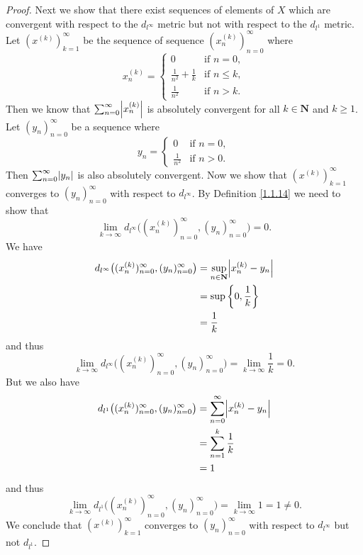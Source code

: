 \begin{proof}
    Next we show that there exist sequences of elements of \(X\) which are convergent with respect to the \(d_{l^\infty}\) metric but not with respect to the \(d_{l^1}\) metric.
    Let \((x^{(k)})_{k = 1}^\infty\) be the sequence of sequence \((x_n^{(k)})_{n = 0}^\infty\) where
    \[
        x_n^{(k)} = \begin{cases}
            0                           & \text{if } n = 0,    \\
            \frac{1}{n^2} + \frac{1}{k} & \text{if } n \leq k, \\
            \frac{1}{n^2}               & \text{if } n > k.
        \end{cases}
    \]
    Then we know that \(\sum_{n = 0}^\infty \abs*{x_n^{(k)}}\) is absolutely convergent for all \(k \in \mathbf{N}\) and \(k \geq 1\).
    Let \((y_n)_{n = 0}^\infty\) be a sequence where
    \[
        y_n = \begin{cases}
            0             & \text{if } n = 0, \\
            \frac{1}{n^2} & \text{if } n > 0.
        \end{cases}
    \]
    Then \(\sum_{n = 0}^\infty \abs*{y_n}\) is also absolutely convergent.
    Now we show that \((x^{(k)})_{k = 1}^\infty\) converges to \((y_n)_{n = 0}^\infty\) with respect to \(d_{l^\infty}\).
    By Definition \ref{1.1.14} we need to show that
    \[
        \lim_{k \to \infty} d_{l^\infty}\big((x_n^{(k)})_{n = 0}^\infty, (y_n)_{n = 0}^\infty\big) = 0.
    \]
    We have
    \begin{align*}
        d_{l^\infty}\big((x_n^{(k)})_{n = 0}^\infty, (y_n)_{n = 0}^\infty\big) & = \sup_{n \in \mathbf{N}} \abs*{x_n^{(k)} - y_n} \\
                                                                               & = \sup \bigg\{0, \frac{1}{k}\bigg\}              \\
                                                                               & = \frac{1}{k}
    \end{align*}
    and thus
    \[
        \lim_{k \to \infty} d_{l^\infty}\big((x_n^{(k)})_{n = 0}^\infty, (y_n)_{n = 0}^\infty\big) = \lim_{k \to \infty} \frac{1}{k} = 0.
    \]
    But we also have
    \begin{align*}
        d_{l^1}\big((x_n^{(k)})_{n = 0}^\infty, (y_n)_{n = 0}^\infty\big) & = \sum_{n = 0}^\infty \abs*{x_n^{(k)} - y_n} \\
                                                                          & = \sum_{n = 1}^k \frac{1}{k}                 \\
                                                                          & = 1
    \end{align*}
    and thus
    \[
        \lim_{k \to \infty} d_{l^1}\big((x_n^{(k)})_{n = 0}^\infty, (y_n)_{n = 0}^\infty\big) = \lim_{k \to \infty} 1 = 1 \neq 0.
    \]
    We conclude that \((x^{(k)})_{k = 1}^\infty\) converges to \((y_n)_{n = 0}^\infty\) with respect to \(d_{l^\infty}\) but not \(d_{l^1}\).


\end{proof}
